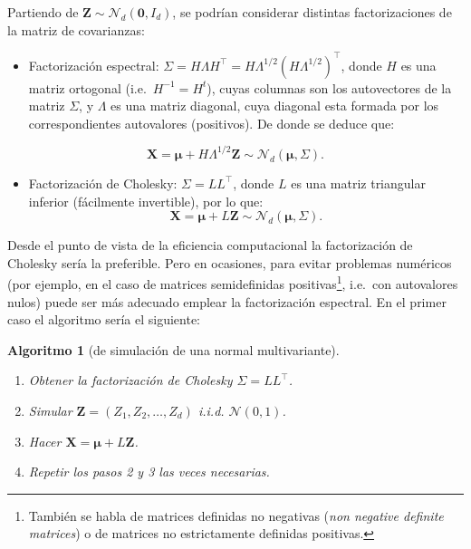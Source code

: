 \documentclass[
  spanish,
  10pt,
]{book}
\providecommand{\tightlist}{%
  \setlength{\itemsep}{0pt}\setlength{\parskip}{0pt}}
\renewcommand{\boldsymbol}[1]{\symbf{#1}}
\renewcommand{\mathbf}[1]{\symbf{#1}}
\theoremstyle{break}
\newtheorem{conjecture}{Algoritmo}[chapter]
\theoremstyle{nonumberplain}
\let\oldfootnote\footnote
\renewcommand\footnote[1]{\oldfootnote{\hspace{2mm}#1}}
\begin{document}
Partiendo de \(\mathbf{Z} \sim \mathcal{N}_d\left( \mathbf{0},I_d\right)\), se podrían considerar distintas factorizaciones de la matriz de covarianzas:

\begin{itemize}
\tightlist
\item
  Factorización espectral:
  \(\Sigma=H\Lambda H^{\top} =H\Lambda^{1/2}(H\Lambda^{1/2})^{\top}\),
  donde \(H\) es una matriz ortogonal (i.e.~\(H^{-1}=H^{t}\)), cuyas columnas son los autovectores de la matriz \(\Sigma\), y \(\Lambda\) es una matriz diagonal, cuya diagonal esta formada por los correspondientes autovalores (positivos). De donde se deduce que:
\end{itemize}

\[\mathbf{X} = \boldsymbol{\mu} + H\Lambda^{1/2}\mathbf{Z} \sim \mathcal{N}_d\left( \boldsymbol{\mu},\Sigma \right).\]

\begin{itemize}
\tightlist
\item
  Factorización de Cholesky: \(\Sigma=LL^{\top}\), donde \(L\) es una matriz triangular inferior (fácilmente invertible), por lo que:
  \[\mathbf{X} = \boldsymbol{\mu} + L\mathbf{Z} 
  \sim \mathcal{N}_d\left( \boldsymbol{\mu},\Sigma \right).\]
\end{itemize}

Desde el punto de vista de la eficiencia computacional la factorización de Cholesky sería la preferible. Pero en ocasiones, para evitar problemas numéricos (por ejemplo, en el caso de matrices semidefinidas positivas\footnote{También se habla de matrices definidas no negativas (\emph{non negative definite matrices}) o de matrices no estrictamente definidas positivas.}, i.e.~con autovalores nulos) puede ser más adecuado emplear la factorización espectral.
En el primer caso el algoritmo sería el siguiente:

\begin{conjecture}[de simulación de una normal multivariante]
\protect\hypertarget{cnj:mnorm-fact}{}\label{cnj:mnorm-fact}

\begin{enumerate}
\def\labelenumi{\arabic{enumi}.}
\item
  Obtener la factorización de Cholesky \(\Sigma=LL^{\top}\).
\item
  Simular \(\mathbf{Z} = \left( Z_1,Z_2,\ldots,Z_d\right)\)
  i.i.d. \(\mathcal{N}\left( 0,1\right)\).
\item
  Hacer \(\mathbf{X} = \boldsymbol{\mu} + L\mathbf{Z}\).
\item
  Repetir los pasos 2 y 3 las veces necesarias.
\end{enumerate}

\end{conjecture}
\end{document}
